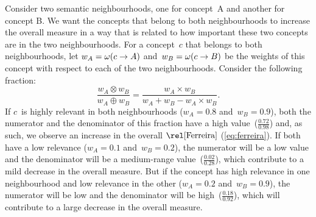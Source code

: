 Consider two semantic neighbourhoods, one for concept~\term A and another for concept \term B. We want the concepts that belong to both neighbourhoods to increase the overall measure in a way that is related to how important these two concepts are in the two neighbourhoods. For a concept~$c$ that belongs to both neighbourhoods, let $w_A=\omega(c\rightarrow A)$ and~$w_B=\omega(c\rightarrow B)$ be the weights of this concept with respect to each of the two neighbourhoods. Consider the following fraction:
\begin{equation}
    \frac{w_A \otimes w_B}{w_A \oplus w_B} =
    \frac{w_A \times w_B}{w_A + w_B - w_A \times w_B}.
\end{equation}
If $c$~is highly relevant in both neighbourhoods (\eg $w_A=0.8$ and~$w_B=0.9$), both the numerator and the denominator of this fraction have a high value~($\frac{0.72}{0.98}$) and, as such, we observe an increase in the overall $\ferreira$ (\eqref{eq:ferreira}). If both have a low relevance (\eg $w_A=0.1$ and~$w_B=0.2$), the numerator will be a low value and the denominator will be a medium-range value~($\frac{0.02}{0.28}$), which contribute to a mild decrease in the overall measure. But if the concept has high relevance in one neighbourhood and low relevance in the other (\eg $w_A=0.2$ and~$w_B=0.9$), the numerator will be low and the denominator will be high~($\frac{0.18}{0.92}$), which will contribute to a large decrease in the overall measure.

